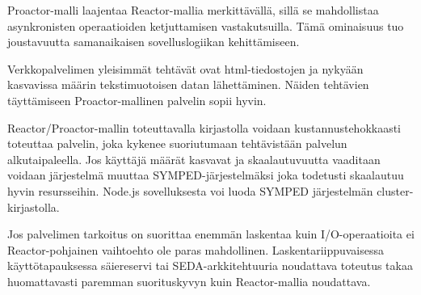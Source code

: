 \documentclass[finnish]{tktltiki2}
\theoremstyle{definition}
\theoremstyle{remark}
\begin{document}
Proactor-malli laajentaa Reactor-mallia merkittävällä,
sillä se mahdollistaa asynkronisten operaatioiden
ketjuttamisen vastakutsuilla. Tämä ominaisuus
tuo joustavuutta samanaikaisen sovelluslogiikan kehittämiseen.

Verkkopalvelimen yleisimmät tehtävät ovat 
html-tiedostojen ja nykyään kasvavissa määrin
tekstimuotoisen datan lähettäminen. 
Näiden tehtävien täyttämiseen Proactor-mallinen
palvelin sopii hyvin.

Reactor/Proactor-mallin toteuttavalla
kirjastolla voidaan kustannustehokkaasti
toteuttaa palvelin, joka kykenee suoriutumaan
tehtävistään palvelun alkutaipaleella. Jos
käyttäjä määrät kasvavat ja skaalautuvuutta
vaaditaan voidaan järjestelmä muuttaa SYMPED-järjestelmäksi
joka todetusti skaalautuu hyvin resursseihin.
Node.js sovelluksesta voi luoda SYMPED järjestelmän
cluster-kirjastolla.

Jos palvelimen tarkoitus on suorittaa enemmän laskentaa kuin
I/O-operaatioita ei Reactor-pohjainen vaihtoehto ole paras mahdollinen.
Laskentariippuvaisessa käyttötapauksessa säiereservi tai SEDA-arkkitehtuuria
noudattava toteutus takaa huomattavasti paremman suorituskyvyn kuin
Reactor-mallia noudattava.




\end{document}
